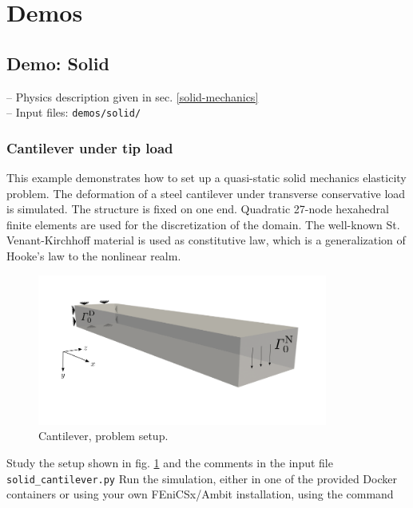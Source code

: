 \documentclass[a4paper,12pt]{report}
\begin{document}
\section{Demos}\label{demos}

\subsection{Demo: Solid}\label{demo-solid}

-- Physics description given in sec. \ref{solid-mechanics}\\

-- Input files: \verb"demos/solid/"

\subsubsection*{Cantilever under tip load}

This example demonstrates how to set up a quasi-static solid mechanics elasticity problem. The deformation of a steel cantilever under transverse conservative load is simulated. The structure is fixed on one end. Quadratic 27-node hexahedral finite elements are used for the discretization of the domain. The well-known St. Venant-Kirchhoff material is used as constitutive law, which is a generalization of Hooke's law to the nonlinear realm.\\

\begin{figure}
\centering
\includegraphics[width=0.85\textwidth]{fig/cantilever_setup.png}
\caption{Cantilever, problem setup.}
\label{fig:cantilever_setup}
\end{figure}

Study the setup shown in fig. \ref{fig:cantilever_setup} and the comments in the input file \verb"solid_cantilever.py" Run the simulation, either in one of the provided Docker containers or using your own FEniCSx/Ambit installation, using the command
\end{document}

